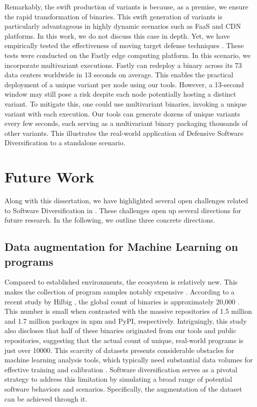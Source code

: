 Remarkably, the swift production of variants is because, as a premise, we ensure the rapid transformation of \Wasm binaries. 
This swift generation of variants is particularly advantageous in highly dynamic scenarios such as FaaS and CDN platforms. 
In this work, we do not discuss this case in depth. 
Yet, we have empirically tested the effectiveness of moving target defense techniques \cite{jackson2011compiler}. 
These tests were conducted on the Fastly edge computing platform.
In this scenario, we incorporate multivariant executions\cite{MEWE}. 
Fastly can redeploy a \Wasm binary across its 73 data centers worldwide in 13 seconds on average. 
This enables the practical deployment of a unique variant per node using our tools. 
However, a 13-second window may still pose a risk despite each node potentially hosting a distinct \Wasm variant. 
To mitigate this, one could use multivariant binaries, invoking a unique variant with each execution. 
Our tools can generate dozens of unique variants every few seconds, each serving as a multivariant binary packaging thousands of other variants. 
This illustrates the real-world application of Defensive Software Diversification to a \Wasm standalone scenario.


\section{Future Work}

Along with this dissertation, we have highlighted several open challenges related to Software Diversification in \Wasm.
These challenges open up several directions for future research.
In the following, we outline three concrete directions.


\vspace{-0.3cm}
\subsection{Data augmentation for Machine Learning on \Wasm programs}
Compared to established environments, the \Wasm ecosystem is relatively new. This makes the collection of \Wasm program samples notably expensive \cite{Hilbig2021AnES, 10174194}.
According to a recent study by Hilbig \etal, the global count of \Wasm binaries is approximately 20,000  \cite{Hilbig2021AnES}. 
This number is small when contrasted with the massive repositories of 1.5 million and 1.7 million packages in npm and PyPI, respectively. 
Intriguingly, this study also discloses that half of these \Wasm binaries originated from our tools and public repositories, suggesting that the actual count of unique, real-world \Wasm programs is just over 10000.
This scarcity of \Wasm datasets presents considerable obstacles for machine learning analysis tools, which typically need substantial data volumes for effective training and calibration \cite{2023arXiv230519915Z}.
Software diversification serves as a pivotal strategy to address this limitation by simulating a broad range of potential software behaviors and scenarios. 
Specifically, the augmentation of the \Wasm dataset can be achieved through it.

